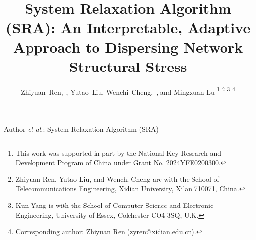 \documentclass[journal]{IEEEtran}
\begin{document}
\title{System Relaxation Algorithm (SRA): An Interpretable, Adaptive Approach to Dispersing Network Structural Stress}


\author{Zhiyuan~Ren,~,
        Yutao~Liu,
        Wenchi~Cheng,~,
        and Mingxuan Lu%
\thanks{This work was supported in part by the National Key Research and Development Program of China under Grant No. 2024YFE0200300.}%
\thanks{Zhiyuan Ren, Yutao Liu, and Wenchi Cheng are with the School of Telecommunications Engineering, Xidian University, Xi'an 710071, China.}%
\thanks{Kun Yang is with the School of Computer Science and Electronic Engineering, University of Essex, Colchester CO4 3SQ, U.K.}%
\thanks{Corresponding author: Zhiyuan Ren (zyren@xidian.edu.cn).}%
}



%
{Author \MakeLowercase{\textit{et al.}}: System Relaxation Algorithm (SRA)}


\maketitle
\end{document}
